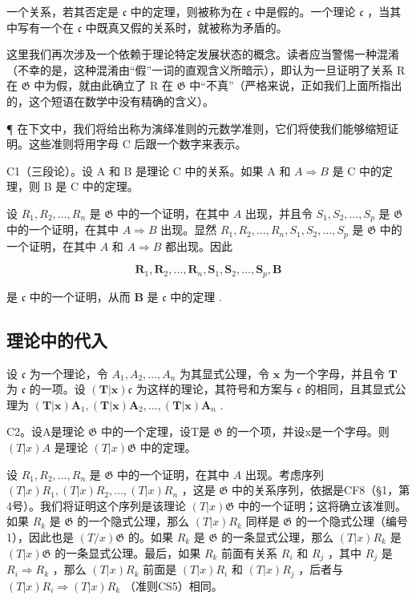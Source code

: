 一个关系，若其否定是 \(\mathfrak{c}\) 中的定理，则被称为在 \(\mathfrak{c}\) 中是假的。一个理论 \(\mathfrak{c}\) ，当其中写有一个在 \(\mathfrak{c}\) 中既真又假的关系时，就被称为矛盾的。

这里我们再次涉及一个依赖于理论特定发展状态的概念。读者应当警惕一种混淆（不幸的是，这种混淆由“假”一词的直观含义所暗示），即认为一旦证明了关系 R 在 \(\mathfrak{G}\) 中为假，就由此确立了 R 在 \(\mathfrak{G}\) 中“不真”（严格来说，正如我们上面所指出的，这个短语在数学中没有精确的含义）。

¶ 在下文中，我们将给出称为演绎准则的元数学准则，它们将使我们能够缩短证明。这些准则将用字母 C 后跟一个数字来表示。

C1（三段论）。设 A 和 B 是理论 C 中的关系。如果 A 和 \(A \Longrightarrow B\) 是 C 中的定理，则 B 是 C 中的定理。

设 \(R_1, R_2, \ldots, R_n\) 是 \(\mathfrak{G}\) 中的一个证明，在其中 \(A\) 出现，并且令 \(S_1, S_2, \ldots, S_p\) 是 \(\mathfrak{G}\) 中的一个证明，在其中 \(A \Longrightarrow B\) 出现。显然 \(R_1, R_2, \ldots, R_n, S_1, S_2, \ldots, S_p\) 是 \(\mathfrak{G}\) 中的一个证明，在其中 \(A\) 和 \(A \Longrightarrow B\) 都出现。因此

\[
\boldsymbol {R} _ {1}, \boldsymbol {R} _ {2}, \dots , \boldsymbol {R} _ {n}, \boldsymbol {S} _ {1}, \boldsymbol {S} _ {2}, \dots , \boldsymbol {S} _ {p}, \boldsymbol {B}
\]

是 \(\mathfrak{c}\) 中的一个证明，从而 \(\pmb{B}\) 是 \(\mathfrak{c}\) 中的定理 .

\subsection{理论中的代入}

设 \(\mathfrak{c}\) 为一个理论，令 \(A_{1}, A_{2}, \ldots, A_{n}\) 为其显式公理，令 \(\pmb{x}\) 为一个字母，并且令 \(\pmb{T}\) 为 \(\mathfrak{c}\) 的一项。设 \((\pmb{T}|\pmb{x})\mathfrak{c}\) 为这样的理论，其符号和方案与 \(\mathfrak{c}\) 的相同，且其显式公理为 \((\pmb{T}|\pmb{x})\pmb{A}_{1}, (\pmb{T}|\pmb{x})\pmb{A}_{2}, \ldots, (\pmb{T}|\pmb{x})\pmb{A}_{n}\) .

C2。设A是理论 \(\mathfrak{G}\) 中的一个定理，设T是 \(\mathfrak{G}\) 的一个项，并设x是一个字母。则 \((T|x)A\) 是理论 \((T|x)\mathfrak{G}\) 中的定理。

设 \(R_1, R_2, \ldots, R_n\) 是 \(\mathfrak{G}\) 中的一个证明，在其中 \(A\) 出现。考虑序列 \((T|x)R_1, (T|x)R_2, \ldots, (T|x)R_n\) ，这是 \(\mathfrak{G}\) 中的关系序列，依据是CF8（§1，第4号）。我们将证明这个序列是该理论 \((T|x)\mathfrak{G}\) 中的一个证明；这将确立该准则。如果 \(R_k\) 是 \(\mathfrak{G}\) 的一个隐式公理，那么 \((T|x)R_k\) 同样是 \(\mathfrak{G}\) 的一个隐式公理（编号1），因此也是 \((T/x)\mathfrak{G}\) 的。如果 \(R_k\) 是 \(\mathfrak{G}\) 的一条显式公理，那么 \((T|x)R_k\) 是 \((T|x)\mathfrak{G}\) 的一条显式公理。最后，如果 \(R_k\) 前面有关系 \(R_i\) 和 \(R_j\) ，其中 \(R_j\) 是 \(R_i \Longrightarrow R_k\) ，那么 \((T|x)R_k\) 前面是 \((T|x)R_i\) 和 \((T|x)R_j\) ，后者与 \((T|x)R_i \Longrightarrow (T|x)R_k\) （准则CS5）相同。

